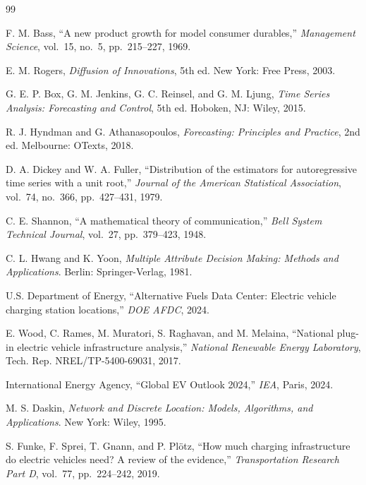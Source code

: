 \documentclass[12pt]{article}
\begin{document}
\begin{thebibliography}{99}

F. M. Bass,
``A new product growth for model consumer durables,''
\emph{Management Science}, vol.~15, no.~5, pp.~215--227, 1969.

E. M. Rogers,
\emph{Diffusion of Innovations}, 5th ed.
New York: Free Press, 2003.

G. E. P. Box, G. M. Jenkins, G. C. Reinsel, and G. M. Ljung,
\emph{Time Series Analysis: Forecasting and Control}, 5th ed.
Hoboken, NJ: Wiley, 2015.

R. J. Hyndman and G. Athanasopoulos,
\emph{Forecasting: Principles and Practice}, 2nd ed.
Melbourne: OTexts, 2018.

D. A. Dickey and W. A. Fuller,
``Distribution of the estimators for autoregressive time series with a unit root,''
\emph{Journal of the American Statistical Association}, vol.~74, no.~366, pp.~427--431, 1979.

C. E. Shannon,
``A mathematical theory of communication,''
\emph{Bell System Technical Journal}, vol.~27, pp.~379--423, 1948.

C. L. Hwang and K. Yoon,
\emph{Multiple Attribute Decision Making: Methods and Applications}.
Berlin: Springer-Verlag, 1981.

U.S. Department of Energy,
``Alternative Fuels Data Center: Electric vehicle charging station locations,''
\emph{DOE AFDC}, 2024.

E. Wood, C. Rames, M. Muratori, S. Raghavan, and M. Melaina,
``National plug-in electric vehicle infrastructure analysis,''
\emph{National Renewable Energy Laboratory}, Tech. Rep. NREL/TP-5400-69031, 2017.

International Energy Agency,
``Global EV Outlook 2024,''
\emph{IEA}, Paris, 2024.

M. S. Daskin,
\emph{Network and Discrete Location: Models, Algorithms, and Applications}.
New York: Wiley, 1995.

S. Funke, F. Sprei, T. Gnann, and P. Pl\"otz,
``How much charging infrastructure do electric vehicles need? A review of the evidence,''
\emph{Transportation Research Part D}, vol.~77, pp.~224--242, 2019.


\end{thebibliography}
\end{document}
